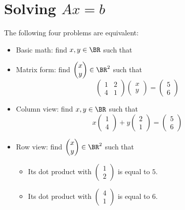 \documentclass[10pt]{amsart}
\theoremstyle{mythm}
\theoremstyle{definition}
\theoremstyle{myrmk}
\begin{document}
	\section{Solving $Ax = b$}
	\noindent
	\begin{minipage}[t]{.5\textwidth}
	The following four problems are equivalent: 
	\bigskip
	\begin{itemize}
		\item Basic math: find $x, y \in \BR$ such that 
		\item Matrix form: find $\begin{pmatrix}
		x \\ y
		\end{pmatrix} \in \BR^2$ such that 
		\[
			\begin{pmatrix}
			1 & 2 \\ 4 & 1
			\end{pmatrix} \begin{pmatrix}
			x \\ y
			\end{pmatrix} = \begin{pmatrix}
			5 \\ 6 
			\end{pmatrix} 
		\]
		\item Column view: find $x, y \in \BR$ such that 
		\[
			x \begin{pmatrix}
			1 \\ 4
			\end{pmatrix} + y \begin{pmatrix}
			2 \\ 1
			\end{pmatrix} = \begin{pmatrix}
			5 \\6 
			\end{pmatrix}
		\]
		\item Row view: find $\begin{pmatrix}
		x \\ y 
		\end{pmatrix} \in \BR^2$ such that 
		\begin{itemize}
			\item Its dot product with $\begin{pmatrix}
			1  \\ 2
			\end{pmatrix}$ is equal to $5$. 
			\item Its dot product with $\begin{pmatrix}
			4 \\ 1
			\end{pmatrix}$ is equal to $6$. 
		\end{itemize}
	\end{itemize}
	\end{minipage}
\end{document}
